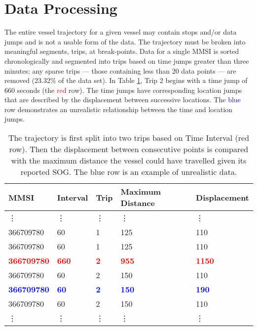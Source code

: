 \documentclass[twoside,symmetric,notoc]{tufte-book}
\begin{document}
\section{Data Processing}
\par{%
The entire vessel trajectory for a given vessel may contain stops and/or data jumps and is not a usable form of the data. The trajectory must be broken into meaningful segments, trips, at break-points. Data for a single MMSI is sorted chronologically and segmented into trips based on time jumps greater than three minutes; any sparse trips --- those containing less than 20 data points --- are removed (23.32\% of the data set). In Table \ref{tab:trips}, Trip 2 begins with a time jump of 660 seconds (the \textcolor{red}{red} row). The time jumps have corresponding location jumps that are described by the displacement between successive locations. The \textcolor{blue}{blue} row demonstrates an unrealistic relationship between the time and location jumps.
}
\begin{table}
    \centering
    \begin{tabular}{l l l l l }
     MMSI       & Interval   & Trip  & Maximum Distance & Displacement  \\
     \hline
     \vdots     & \vdots & \vdots & \vdots & \vdots \\
     366709780	& 60    & 1 & 125 & 110 \\
     366709780	& 60    & 1 & 125 & 110 \\
     \textbf{\textcolor{red}{366709780}}	& \textbf{\textcolor{red}{660}}    & \textbf{\textcolor{red}{2}} & \textbf{\textcolor{red}{955}} & \textbf{\textcolor{red}{1150}} \\  
     366709780	& 60    & 2 & 150 & 110 \\ 
     \textbf{\textcolor{blue}{366709780}}	& \textbf{\textcolor{blue}{60}}    & \textbf{\textcolor{blue}{2}} & \textbf{\textcolor{blue}{150}} & \textbf{\textcolor{blue}{190}} \\    
     366709780	& 60   & 2 & 150 & 110 \\
     \vdots     & \vdots & \vdots & \vdots & \vdots \\
     \hline
    \end{tabular}
    \vspace{0.1in}
    \caption{The trajectory is first split into two trips based on Time Interval (red row). Then the displacement between consecutive points is compared with the maximum distance the vessel could have travelled given its reported SOG. The blue row is an example of unrealistic data.}
    \label{tab:trips}
    \forcerectofloat
\end{table}
\end{document}
